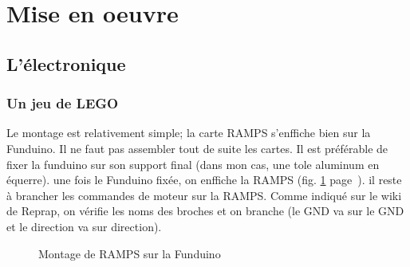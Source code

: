 \section{Mise en oeuvre}%
\subsection{L'électronique}%
\subsubsection{Un jeu de LEGO}
Le montage est relativement simple; la carte RAMPS s'enffiche bien sur la Funduino. %
Il ne faut pas  assembler tout de suite les cartes. Il est préférable de fixer la %
funduino sur son support final (dans mon cas, une tole aluminum en équerre). une fois %
le Funduino fixée, on enffiche  la RAMPS (fig. \ref{montage_carte} %
page~\pageref{montage_carte}). il reste à brancher les commandes de moteur %
sur la RAMPS. Comme indiqué sur le wiki de Reprap, on vérifie les noms des broches et %
on branche (le GND va sur le GND et le direction va sur direction).%
\begin{figure}%
   \caption{\label{montage_carte} Montage de RAMPS sur la Funduino}%
\end{figure}%
